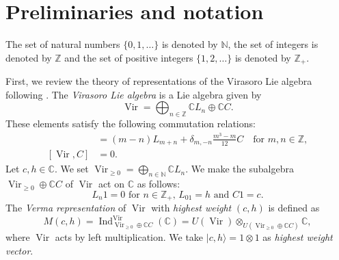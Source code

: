 \documentclass[a4paper, 12pt, reqno]{amsart}
\theoremstyle{remark}
\DeclareMathOperator{\Vir}{Vir}
\DeclareMathOperator{\Ind}{Ind}
\begin{document}
\section{Preliminaries and notation}
\label{sec:prel-notat}

The set of natural numbers $\{0, 1, \dots\}$ is denoted by $\mathbb{N}$, the set of integers is denoted by $\mathbb{Z}$ and the set of positive integers $\{1, 2, \dots\}$ is denoted by $\mathbb{Z}_+$.

First, we review the theory of representations of the Virasoro Lie algebra following \cite{kac_bombay_2013}.
The \emph{Virasoro Lie algebra} is a Lie algebra given by
\begin{equation*}
  \Vir = \bigoplus_{n \in \mathbb{Z}}\mathbb{C}L_n \oplus \mathbb{C}C.
\end{equation*}
These elements satisfy the following commutation relations:
\begin{align*}
  [L_m, L_n] &= (m - n)L_{m + n} + \delta_{m, -n}\frac{m^3 - m}{12}C \quad \text{for $m, n \in \mathbb{Z}$}, \\
  [\Vir, C] &= 0.
\end{align*}
Let $c, h \in \mathbb{C}$.
We set $\Vir_{\ge 0} = \bigoplus_{n \in \mathbb{N}}\mathbb{C}L_n$.
We make the subalgebra $\Vir_{\ge 0} \oplus \mathbb{C}C$ of $\Vir$ act on $\mathbb{C}$ as follows:
\begin{equation*}
  \text{$L_n1 = 0$ for $n \in \mathbb{Z}_+$, $L_01 = h$ and $C1 = c$}.
\end{equation*}
The \emph{Verma representation} of $\Vir$ with \emph{highest weight} $(c, h)$ is defined as
\begin{equation*}
  M(c, h) = \Ind^{\Vir}_{\Vir_{\ge 0} \oplus \mathbb{C}C}(\mathbb{C}) = U(\Vir) \otimes_{U(\Vir_{\ge 0} \oplus \mathbb{C}C)} \mathbb{C},
\end{equation*}
where $\Vir$ acts by left multiplication.
We take $|c, h\rangle = 1 \otimes 1$ as \emph{highest weight vector}.
\end{document}
